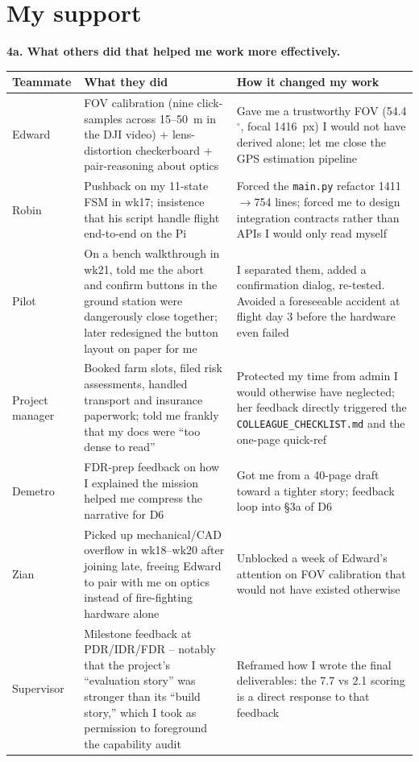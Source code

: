 \section{My support}

\textbf{4a. What others did that helped me work more effectively.} 

{\footnotesize
\begin{tabularx}{\textwidth}{@{}p{2.4cm} X p{3.6cm}@{}}
\toprule
\textbf{Teammate} & \textbf{What they did} & \textbf{How it changed my work} \\
\midrule
Edward & FOV calibration (nine click-samples across 15--50~m in the DJI video) + lens-distortion checkerboard + pair-reasoning about optics & Gave me a trustworthy FOV (54.4$^\circ$, focal 1416~px) I would not have derived alone; let me close the GPS estimation pipeline \\
Robin & Pushback on my 11-state FSM in wk17; insistence that his script handle flight end-to-end on the Pi & Forced the \texttt{main.py} refactor 1411$\to$754 lines; forced me to design integration contracts rather than APIs I would only read myself \\
Pilot & On a bench walkthrough in wk21, told me the abort and confirm buttons in the ground station were dangerously close together; later redesigned the button layout on paper for me & I separated them, added a confirmation dialog, re-tested. Avoided a foreseeable accident at flight day 3 before the hardware even failed \\
Project manager & Booked farm slots, filed risk assessments, handled transport and insurance paperwork; told me frankly that my docs were ``too dense to read'' & Protected my time from admin I would otherwise have neglected; her feedback directly triggered the \texttt{COLLEAGUE\_CHECKLIST.md} and the one-page quick-ref \\
Demetro & FDR-prep feedback on how I explained the mission helped me compress the narrative for D6 & Got me from a 40-page draft toward a tighter story; feedback loop into \S3a of D6 \\
Zian & Picked up mechanical/CAD overflow in wk18--wk20 after joining late, freeing Edward to pair with me on optics instead of fire-fighting hardware alone & Unblocked a week of Edward's attention on FOV calibration that would not have existed otherwise \\
Supervisor & Milestone feedback at PDR/IDR/FDR -- notably that the project's ``evaluation story'' was stronger than its ``build story,'' which I took as permission to foreground the capability audit & Reframed how I wrote the final deliverables: the 7.7 vs 2.1 scoring is a direct response to that feedback \\
\bottomrule
\end{tabularx}}

